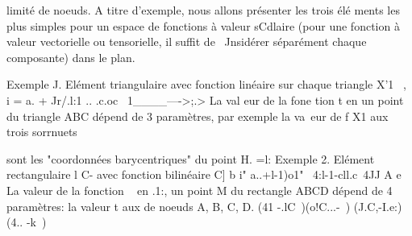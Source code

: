 limité de noeuds. A titre d'exemple, nous allons présenter les trois élé
ments  les  plus simples  pour  un  espace  de  fonctions  à  valeur sCdlaire  (pour  
une  fonction  à  valeur vectorielle  ou  tensorielle,  il  suffit de  ~Jnsidérer  
séparément chaque composante)  dans  le plan.  

Exemple J. Elément triangulaire avec fonction linéaire sur chaque triangle 
X'1 ~,
i = a. + Jr/.l:1 .. .c.oc~ 
1____---->;.> 
La val eur de la fone tion t en un point du triangle ABC dépend de 3 paramètres, par exemple la va~eur de f X1 aux trois sorrnuets 


sont les "coordonnées barycentriques" du point H. 
=l: 
Exemple 2. Elément rectangulaire l 
C-
avec fonction bilinéaire 
C] b 
i" a..+l-1)o1" ~4:l-1-cll.c~4JJ 
A e 
La valeur de la fonction ~ en 
.1:, 
un point M du rectangle ABCD dépend de 4 paramètres: la valeur t aux
de 
noeuds A, B, C, D. 
(41 -.lC~)(o!C...-~) (J.C,-I.e:) (4.. -k~)
